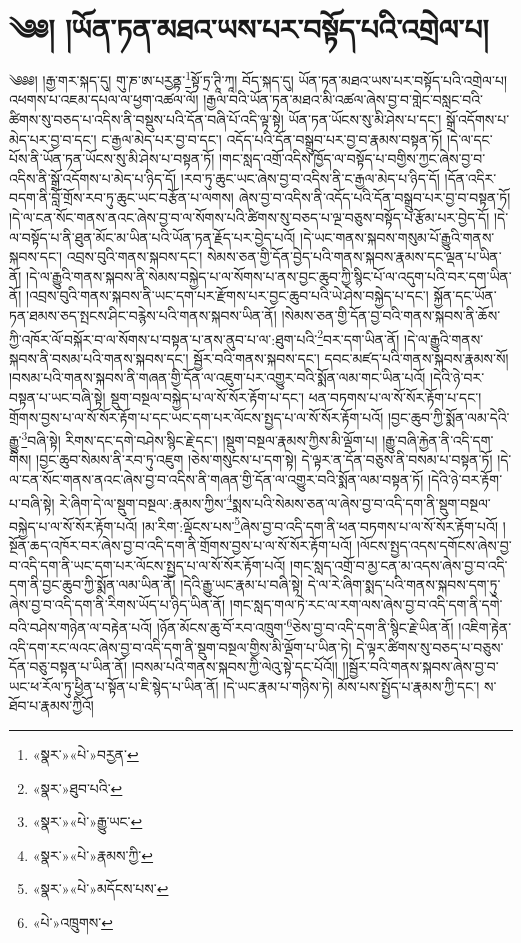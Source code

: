 \chapter{༄༅། །ཡོན་ཏན་མཐའ་ཡས་པར་བསྟོད་པའི་འགྲེལ་པ།}༄༅༅། །རྒྱ་གར་སྐད་དུ། གུ་ཎ་ཨ་པརྱནྟ་\footnote{«སྣར་»«པེ་»བརྱན་}སྟོ་ཏྲ་ཊཱི་ཀཱ། བོད་སྐད་དུ། ཡོན་ཏན་མཐའ་ཡས་པར་བསྟོད་པའི་འགྲེལ་པ། འཕགས་པ་འཇམ་དཔལ་ལ་ཕྱག་འཚལ་ལོ། །རྒྱལ་བའི་ཡོན་ཏན་མཐའ་མི་འཚལ་ཞེས་བྱ་བ་གླེང་བསླང་བའི་ཚིགས་སུ་བཅད་པ་འདིས་ནི་བསྡུས་པའི་དོན་བཞི་པོ་འདི་ལྟ་སྟེ། ཡོན་ཏན་ཡོངས་སུ་མི་ཤེས་པ་དང་། སྒྲོ་འདོགས་པ་མེད་པར་བྱ་བ་དང་། ང་རྒྱལ་མེད་པར་བྱ་བ་དང་། འདོད་པའི་དོན་བསྒྲུབ་པར་བྱ་བ་རྣམས་བསྟན་ཏོ། །དེ་ལ་དང་པོས་ནི་ཡོན་ཏན་ཡོངས་སུ་མི་ཤེས་པ་བསྟན་ཏོ། །གང་སླད་འགྲོ་འདིས་ཁྱོད་ལ་བསྟོད་པ་བགྱིས་ཀྱང་ཞེས་བྱ་བ་འདིས་ནི་སྒྲོ་འདོགས་པ་མེད་པ་ཉིད་དོ། །རབ་ཏུ་ཆུང་ཡང་ཞེས་བྱ་བ་འདིས་ནི་ང་རྒྱལ་མེད་པ་ཉིད་དོ། །དོན་འདིར་བདག་ནི་བློ་གྲོས་རབ་ཏུ་ཆུང་ཡང་བརྩོན་པ་ལགས། ཞེས་བྱ་བ་འདིས་ནི་འདོད་པའི་དོན་བསྒྲུབ་པར་བྱ་བ་བསྟན་ཏོ། །དེ་ལ་ངན་སོང་གནས་ནའང་ཞེས་བྱ་བ་ལ་སོགས་པའི་ཚིགས་སུ་བཅད་པ་ལྔ་བཅུས་བསྟོད་པ་རྩོམ་པར་བྱེད་དོ། །དེ་ལ་བསྟོད་པ་ནི་ཐུན་མོང་མ་ཡིན་པའི་ཡོན་ཏན་རྗོད་པར་བྱེད་པའོ། །དེ་ཡང་གནས་སྐབས་གསུམ་པོ་རྒྱུའི་གནས་སྐབས་དང་། འབྲས་བུའི་གནས་སྐབས་དང་། སེམས་ཅན་གྱི་དོན་བྱེད་པའི་གནས་སྐབས་རྣམས་དང་ལྡན་པ་ཡིན་ནོ། །དེ་ལ་རྒྱུའི་གནས་སྐབས་ནི་སེམས་བསྐྱེད་པ་ལ་སོགས་པ་ནས་བྱང་ཆུབ་ཀྱི་སྙིང་པོ་ལ་འདུག་པའི་བར་དག་ཡིན་ནོ། །འབྲས་བུའི་གནས་སྐབས་ནི་ཡང་དག་པར་རྫོགས་པར་བྱང་ཆུབ་པའི་ཡེ་ཤེས་བསྐྱེད་པ་དང་། སྐྱོན་དང་ཡོན་ཏན་ཐམས་ཅད་སྤངས་ཤིང་བརྙེས་པའི་གནས་སྐབས་ཡིན་ནོ། །སེམས་ཅན་གྱི་དོན་བྱ་བའི་གནས་སྐབས་ནི་ཆོས་ཀྱི་འཁོར་ལོ་བསྐོར་བ་ལ་སོགས་པ་བསྟན་པ་ནས་ནུབ་པ་ལ་:ཐུག་པའི་\footnote{«སྣར་»ཐུབ་པའི་}བར་དག་ཡིན་ནོ། །དེ་ལ་རྒྱུའི་གནས་སྐབས་ནི་བསམ་པའི་གནས་སྐབས་དང་། སྦྱོར་བའི་གནས་སྐབས་དང་། དབང་མཛད་པའི་གནས་སྐབས་རྣམས་སོ། །བསམ་པའི་གནས་སྐབས་ནི་གཞན་གྱི་དོན་ལ་འཇུག་པར་འགྱུར་བའི་སྨོན་ལམ་གང་ཡིན་པའོ། །དེའི་ཉེ་བར་བསྟན་པ་ཡང་བཞི་སྟེ། སྡུག་བསྔལ་བསྐྱེད་པ་ལ་སོ་སོར་རྟོག་པ་དང་། ཕན་བཏགས་པ་ལ་སོ་སོར་རྟོག་པ་དང་། གྲོགས་བྱས་པ་ལ་སོ་སོར་རྟོག་པ་དང་ཡང་དག་པར་ལོངས་སྤྱད་པ་ལ་སོ་སོར་རྟོག་པའོ། །བྱང་ཆུབ་ཀྱི་སྨོན་ལམ་དེའི་རྒྱུ་\footnote{«སྣར་»«པེ་»རྒྱུ་ཡང་}བཞི་སྟེ། རིགས་དང་དགེ་བཤེས་སྙིང་རྗེ་དང་། །སྡུག་བསྔལ་རྣམས་ཀྱིས་མི་ལྡོག་པ། །རྒྱུ་བཞི་རྐྱེན་ནི་འདི་དག་གིས། །བྱང་ཆུབ་སེམས་ནི་རབ་ཏུ་འཇུག །ཅེས་གསུངས་པ་དག་སྟེ། དེ་ལྟར་ན་དོན་བཅུས་ནི་བསམ་པ་བསྟན་ཏོ། །དེ་ལ་ངན་སོང་གནས་ནའང་ཞེས་བྱ་བ་འདིས་ནི་གཞན་གྱི་དོན་ལ་འགྱུར་བའི་སྨོན་ལམ་བསྟན་ཏོ། །དེའི་ཉེ་བར་རྟོག་པ་བཞི་སྟེ། རེ་ཞིག་དེ་ལ་སྡུག་བསྔལ་:རྣམས་ཀྱིས་\footnote{«སྣར་»«པེ་»རྣམས་ཀྱི་}སྨས་པའི་སེམས་ཅན་ལ་ཞེས་བྱ་བ་འདི་དག་ནི་སྡུག་བསྔལ་བསྐྱེད་པ་ལ་སོ་སོར་རྟོག་པའོ། །མ་རིག་:ལྡོངས་པས་\footnote{«སྣར་»«པེ་»མདོངས་པས་}ཞེས་བྱ་བ་འདི་དག་ནི་ཕན་བཏགས་པ་ལ་སོ་སོར་རྟོག་པའོ། །སྔོན་ཆད་འཁོར་བར་ཞེས་བྱ་བ་འདི་དག་ནི་གྲོགས་བྱས་པ་ལ་སོ་སོར་རྟོག་པའོ། །ལོངས་སྤྱད་འདས་དགོངས་ཞེས་བྱ་བ་འདི་དག་ནི་ཡང་དག་པར་ལོངས་སྤྱད་པ་ལ་སོ་སོར་རྟོག་པའོ། །གང་སླད་འགྲོ་བ་མྱ་ངན་མ་འདས་ཞེས་བྱ་བ་འདི་དག་ནི་བྱང་ཆུབ་ཀྱི་སྨོན་ལམ་ཡིན་ནོ། །དེའི་རྒྱུ་ཡང་རྣམ་པ་བཞི་སྟེ། དེ་ལ་རེ་ཞིག་སྨད་པའི་གནས་སྐབས་དག་ཏུ་ཞེས་བྱ་བ་འདི་དག་ནི་རིགས་ཡོད་པ་ཉིད་ཡིན་ནོ། །གང་སླད་གལ་ཏེ་རང་ལ་རག་ལས་ཞེས་བྱ་བ་འདི་དག་ནི་དགེ་བའི་བཤེས་གཉེན་ལ་བརྟེན་པའོ། །ཉོན་མོངས་ཆུ་བོ་རབ་འཁྲུག་\footnote{«པེ་»འཁྲུགས་}ཅེས་བྱ་བ་འདི་དག་ནི་སྙིང་རྗེ་ཡིན་ནོ། །འཇིག་རྟེན་འདི་དག་རང་ལའང་ཞེས་བྱ་བ་འདི་དག་ནི་སྡུག་བསྔལ་གྱིས་མི་ལྡོག་པ་ཡིན་ཏེ། དེ་ལྟར་ཚིགས་སུ་བཅད་པ་བཅུས་དོན་བཅུ་བསྟན་པ་ཡིན་ནོ། །བསམ་པའི་གནས་སྐབས་ཀྱི་ལེའུ་སྟེ་དང་པོའོ།། །།སྦྱོར་བའི་གནས་སྐབས་ཞེས་བྱ་བ་ཡང་ཕ་རོལ་ཏུ་ཕྱིན་པ་སྟོན་པ་ཇི་སྙེད་པ་ཡིན་ནོ། །དེ་ཡང་རྣམ་པ་གཉིས་ཏེ། མོས་པས་སྤྱོད་པ་རྣམས་ཀྱི་དང་། ས་ཐོབ་པ་རྣམས་ཀྱིའོ། 